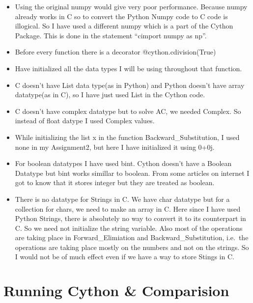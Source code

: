 \documentclass[11pt]{article}
\providecommand{\tightlist}{%
      \setlength{\itemsep}{0pt}\setlength{\parskip}{0pt}}
\begin{document}
\begin{itemize}
\tightlist
\item
  Using the original numpy would give very poor performance. Because
  numpy already works in C so to convert the Python Numpy code to C code
  is illogical. So I have used a different numpy which is a part of the
  Cython Package. This is done in the statement ``cimport numpy as np''.
\item
  Before every function there is a decorator @cython.cdivision(True)
\item
  Have initialized all the data types I will be using throughout that
  function.
\item
  C doesn't have List data type(as in Python) and Python doesn't have
  array datatype(as in C), so I have just used List in the Cython code.
\item
  C doesn't have complex datatype but to solve AC, we needed Complex. So
  instead of float datype I used Complex values.
\item
  While initializing the list x in the function Backward\_Substitution,
  I used none in my Assignment2, but here I have initialized it using
  0+0j.
\item
  For boolean datatypes I have used bint. Cython doesn't have a Boolean
  Datatype but bint works simillar to boolean. From some articles on
  internet I got to know that it stores integer but they are treated as
  boolean.
\item
  There is no datatype for Strings in C. We have char datatype but for a
  collection for chars, we need to make an array in C. Here since I have
  used Python Strings, there is absolutely no way to convert it to its
  counterpart in C. So we need not initialize the string variable. Also
  most of the operations are taking place in Forward\_Elimiation and
  Backward\_Substitution, i.e.~the operations are taking place mostly on
  the numbers and not on the strings. So I would not be of much effect
  even if we have a way to store Stings in C.
\end{itemize}

    \hypertarget{running-cython-comparision}{%
\section{Running Cython \&
Comparision}\label{running-cython-comparision}}
\end{document}

